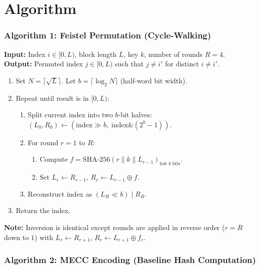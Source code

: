\chapter*{Algorithm}
\noindent

\subsection*{Algorithm 1: Feistel Permutation (Cycle-Walking)}

\noindent\textbf{Input:} Index $i \in [0, L)$, block length $L$, key $k$, number of rounds $R=4$.\\
\textbf{Output:} Permuted index $j \in [0, L)$ such that $j \neq i'$ for distinct $i \neq i'$.

\begin{enumerate}
    \item Set $N = \lceil\sqrt{L}\rceil$. Let $b = \lceil\log_2 N \rceil$ (half-word bit width).
    \item Repeat until result is in $[0, L)$:
    \begin{enumerate}
        \item Split current index into two $b$-bit halves: $(L_0, R_0) \gets (\text{index} \gg b,\; \text{index} \mathbin{\&} (2^b{-}1))$.
        \item For round $r = 1$ to $R$:
        \begin{enumerate}
            \item Compute $f = \text{SHA-256}(r \| k \| L_{r-1})_{\text{low }b\text{ bits}}$.
            \item Set $L_r \gets R_{r-1}$, $R_r \gets L_{r-1} \oplus f$.
        \end{enumerate}
        \item Reconstruct index as $(L_R \ll b) \mathbin{|} R_R$.
    \end{enumerate}
    \item Return the index.
\end{enumerate}

\textbf{Note:} Inversion is identical except rounds are applied in reverse order ($r = R$ down to $1$) with $L_r \gets R_{r+1}$, $R_r \gets L_{r+1} \oplus f_r$.

\bigskip

\subsection*{Algorithm 2: MECC Encoding (Baseline Hash Computation)}

